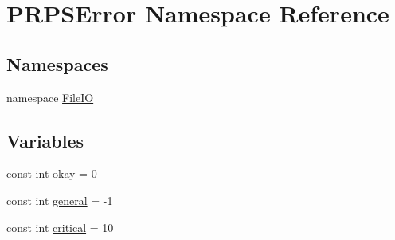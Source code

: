 \hypertarget{namespace_p_r_p_s_error}{\section{\-P\-R\-P\-S\-Error \-Namespace \-Reference}
\label{namespace_p_r_p_s_error}
}
\subsection*{\-Namespaces}
\begin{DoxyCompactItemize}
\item 
namespace \hyperlink{namespace_p_r_p_s_error_1_1_file_i_o}{\-File\-I\-O}
\end{DoxyCompactItemize}
\subsection*{\-Variables}
\begin{DoxyCompactItemize}
\item 
const int \hyperlink{namespace_p_r_p_s_error_a504d9167db089a807cc91bd217b6c976}{okay} = 0
\item 
const int \hyperlink{namespace_p_r_p_s_error_ac3c2f69daed93e3a7674df731358b01a}{general} = -\/1
\item 
const int \hyperlink{namespace_p_r_p_s_error_addc545a6b9d0f209f59d90b898a2e790}{critical} = 10
\end{DoxyCompactItemize}


